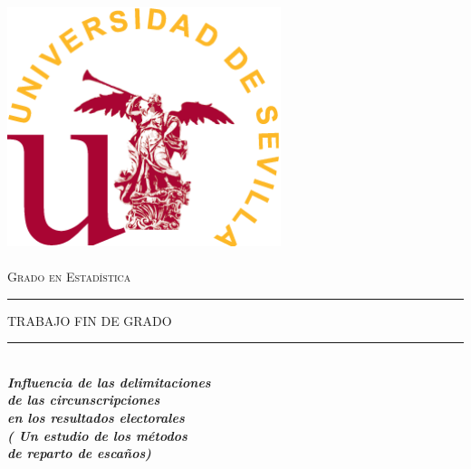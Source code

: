 \documentclass[12pt,a4paper,]{book}
\title{}
\author{}
\date{}
\numberwithin{dummy}{section}
\theoremstyle{ocrenumbox}
\theoremstyle{blacknumex}
\theoremstyle{blacknumbox}
\theoremstyle{ocrenum}
\theoremstyle{ocrenum}
\begin{document}
\begin{titlepage}

\newcommand{\HRule}{\rule{\linewidth}{0.5mm}} %

\center %


\begin{minipage}{14cm}
\center

\includegraphics[width=8cm,height=8cm]{logo}\\[0.5cm] %


\textsc{\LARGE Grado en Estadística}\\[2.5cm] 



\rule[1.7mm]{2cm}{0.5mm}
\hfill
\textsc{\Large TRABAJO FIN DE GRADO} 
\hfill
\rule[1.7mm]{2cm}{0.5mm} 
\\[0.75cm]

{\LARGE
\textbf{\textit{
Influencia de las delimitaciones \\[0.2cm]
de las circunscripciones \\[0.5cm]
en los resultados electorales
}}}\\[0.3cm] 
{\normalsize
\textbf{\textit{
( Un estudio de los métodos \\[0.2cm]
de reparto de escaños)
}}}\\[0.75cm] 


\end{minipage}
\end{titlepage}
\end{document}
